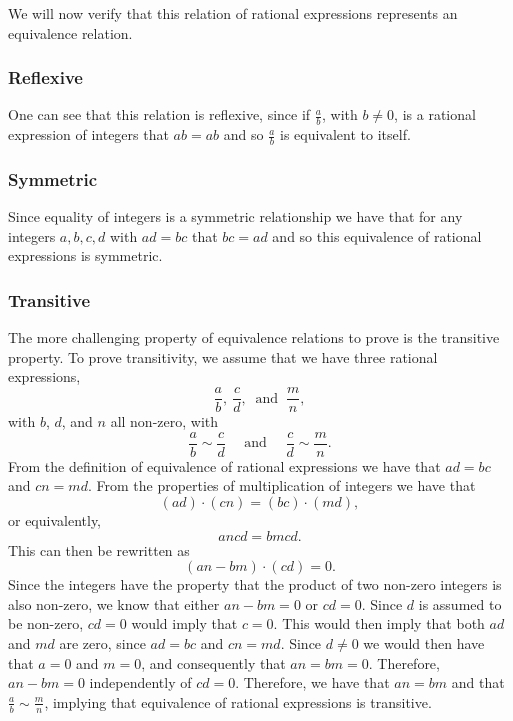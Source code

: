 \documentclass[
]{book}
\theoremstyle{definition}
\theoremstyle{definition}
\theoremstyle{definition}
\theoremstyle{definition}
\theoremstyle{remark}
\begin{document}
We will now verify that this relation of rational expressions represents an equivalence relation.

\hypertarget{reflexive}{%
\subsubsection*{Reflexive}\label{reflexive}}

One can see that this relation is reflexive, since if \(\frac{a}{b}\), with \(b\neq 0\), is a rational expression of integers that \(ab=ab\) and so \(\frac{a}{b}\) is equivalent to itself.

\hypertarget{symmetric}{%
\subsubsection*{Symmetric}\label{symmetric}}

Since equality of integers is a symmetric relationship we have that for any integers \(a,b,c,d\) with \(ad=bc\) that \(bc=ad\) and so this equivalence of rational expressions is symmetric.

\hypertarget{transitive}{%
\subsubsection*{Transitive}\label{transitive}}

The more challenging property of equivalence relations to prove is the transitive property. To prove transitivity, we assume that we have three rational expressions, \[\frac{a}{b}, \: \frac{c}{d}, \: \mbox{ and } \: \frac{m}{n},\] with \(b\), \(d\), and \(n\) all non-zero, with \[\frac{a}{b}\sim \frac{c}{d} \quad \mbox{ and } \quad \frac{c}{d} \sim \frac{m}{n}.\] From the definition of equivalence of rational expressions we have that \(ad=bc\) and \(cn=md\). From the properties of multiplication of integers we have that \[(ad)\cdot (cn) = (bc) \cdot (md),\] or equivalently,
\[ancd = bmcd.\] This can then be rewritten as \[ (an-bm)\cdot (cd) =0.\] Since the integers have the property that the product of two non-zero integers is also non-zero, we know that either \(an-bm=0\) or \(cd=0\). Since \(d\) is assumed to be non-zero, \(cd=0\) would imply that \(c=0\). This would then imply that both \(ad\) and \(md\) are zero, since \(ad=bc\) and \(cn=md\). Since \(d\neq 0\) we would then have that \(a=0\) and \(m=0\), and consequently that \(an=bm=0\). Therefore, \(an-bm=0\) independently of \(cd=0\). Therefore, we have that \(an=bm\) and that \(\frac{a}{b}\sim \frac{m}{n}\), implying that equivalence of rational expressions is transitive.
\end{document}
